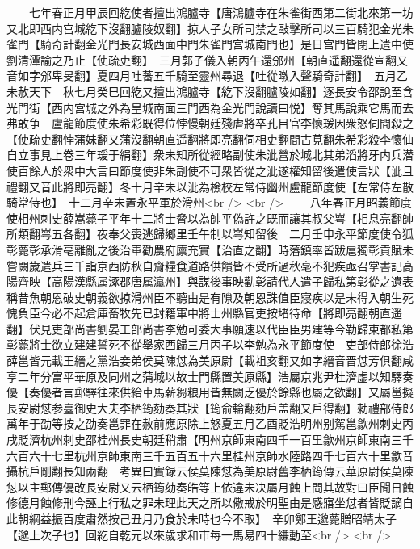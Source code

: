 　　七年春正月甲辰回紇使者擅出鴻臚寺【唐鴻臚寺在朱雀街西第二街北來第一坊又北即西内宫城紇下沒翻臚陵奴翻】掠人子女所司禁之敺擊所司以三百騎犯金光朱雀門【騎奇計翻金光門長安城西面中門朱雀門宫城南門也】是日宫門皆閉上遣中使劉清潭諭之乃止【使疏吏翻】　三月郭子儀入朝丙午還邠州【朝直遥翻還從宣翻又音如字邠卑旻翻】夏四月吐蕃五千騎至靈州尋退【吐從暾入聲騎奇計翻】　五月乙未赦天下　秋七月癸巳回紇又擅出鴻臚寺【紇下沒翻臚陵如翻】逐長安令邵說至含光門街【西内宫城之外為皇城南面三門西為金光門說讀曰悦】奪其馬說乘它馬而去弗敢争　盧龍節度使朱希彩既得位悖慢朝廷殘虐將卒孔目官李懷瑗因衆怒伺間殺之【使疏吏翻悖蒲妹翻又蒲沒翻朝直遥翻將即亮翻伺相吏翻間古莧翻朱希彩殺李懷仙自立事見上卷三年瑗于絹翻】衆未知所從經略副使朱泚營於城北其弟滔將牙内兵潜使百餘人於衆中大言曰節度使非朱副使不可衆皆從之泚遂權知留後遣使言狀【泚且禮翻又音此將即亮翻】冬十月辛未以泚為檢校左常侍幽州盧龍節度使【左常侍左散騎常侍也】　十二月辛未置永平軍於滑州<br />
<br />
　　八年春正月昭義節度使相州刺史薛嵩薨子平年十二將士脅以為帥平偽許之既而讓其叔父㟧【相息亮翻帥所類翻㟧五各翻】夜奉父喪逃歸鄉里壬午制以㟧知留後　二月壬申永平節度使令狐彰薨彰承滑亳離亂之後治軍勸農府廪充實【治直之翻】時藩鎮率皆跋扈獨彰貢賦未嘗闕歲遣兵三千詣京西防秋自齎糧食道路供饋皆不受所過秋毫不犯疾亟召掌書記高陽齊映【高陽漢縣属涿郡唐属瀛州】與謀後事映勸彰請代人遣子歸私第彰從之遺表稱昔魚朝恩破史朝義欲掠滑州臣不聽由是有隙及朝恩誅值臣寢疾以是未得入朝生死愧負臣今必不起倉庫畜牧先已封籍軍中將士州縣官吏按堵待命【將即亮翻朝直遥翻】伏見吏部尚書劉晏工部尚書李勉可委大事願速以代臣臣男建等今勒歸東都私第彰薨將士欲立建建誓死不從舉家西歸三月丙子以李勉為永平節度使　吏部侍郎徐浩薛邕皆元載王縉之黨浩妾弟侯莫陳怤為美原尉【載祖亥翻又如字縉音晋怤芳俱翻咸亨二年分富平華原及同州之蒲城以故士門縣置美原縣】浩屬京兆尹杜濟虚以知驛奏優【奏優者言郵驛往來供給車馬薪芻粮用皆無闕乏優於餘縣也屬之欲翻】又屬邕擬長安尉怤参臺御史大夫李栖筠劾奏其狀【筠俞輪翻劾戶盖翻又戶得翻】勑禮部侍郎萬年于劭等按之劭奏邕罪在赦前應原除上怒夏五月乙酉貶浩明州别駕邕歙州刺史丙戌貶濟杭州刺史邵桂州長史朝廷稍肅【明州京師東南四千一百里歙州京師東南三千六百六十七里杭州京師東南三千五百五十六里桂州京師水陸路四千七百六十里歙音攝杭戶剛翻長知兩翻　考異曰實録云侯莫陳怤為美原尉舊李栖筠傳云華原尉侯莫陳怤以主郵傳優改長安尉又云栖筠劾奏皓等上依違未决屬月蝕上問其故對曰臣聞日蝕修德月蝕修刑今誣上行私之罪未理此天之所以儆戒於明聖由是感寤坐怤者皆貶謫自此朝綱益振百度肅然按己丑月乃食於未時也今不取】　辛卯鄭王邈薨贈昭靖太子【邈上次子也】回紇自乾元以來歲求和市每一馬易四十縑動至<br />
<br />
